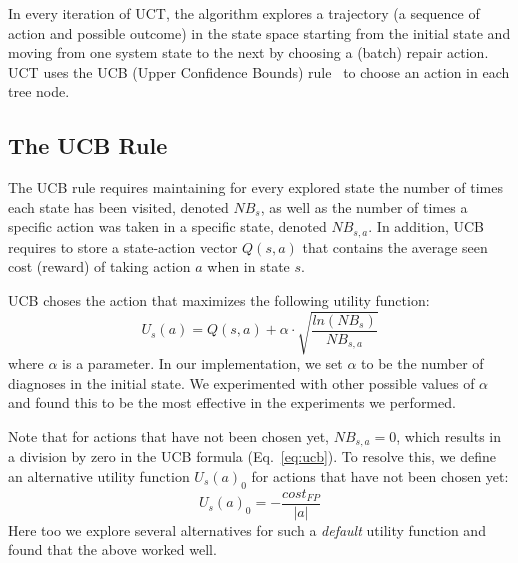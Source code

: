 \documentclass[a4paper,11pt]{report}
\newcommand\meir[1]{\textcolor{red}{meir: #1}}
\begin{document}
In every iteration of UCT, the algorithm explores a trajectory (a sequence of action and possible outcome) in the state space starting from the initial state and moving from one system state to the next by choosing a (batch) repair action. UCT uses the UCB (Upper Confidence Bounds) rule~\cite{auer2002finite} to choose an action in each tree node. 

\subsection{The UCB Rule}
The UCB rule requires maintaining for every explored state the number of times each state has been visited, denoted $NB_{s}$, as well as the number of times a specific action was taken in a specific state, denoted $NB_{s,a}$. In addition, UCB requires to store a state-action vector $Q(s,a)$ that contains the average seen cost (reward) of taking action $a$ when in state $s$. 

UCB choses the action that maximizes the following utility function:
\begin{equation}
U_s(a)= Q(s,a) + \alpha\cdot \sqrt{\frac{ln(NB_{s})}{NB_{s,a}}}
\label{eq:ucb}
\end{equation}
where $\alpha$ is a parameter. In our implementation, we set $\alpha$ to be the number of diagnoses in the initial state. We experimented with other possible values of $\alpha$ and found this to be the most effective in the experiments we performed.


Note that for actions that have not been chosen yet, $NB_{s,a} = 0$, which results in a division by zero in the UCB formula (Eq.~\ref{eq:ucb}). To resolve this, we define an alternative utility function $U_s(a)_0$ for 
actions that have not been chosen yet: 
\[ U_s(a)_0 = - \frac{cost_{FP}}{|a|} \]
Here too we explore several alternatives for 
such a \emph{default} utility function and found that the above worked well.
\end{document}
